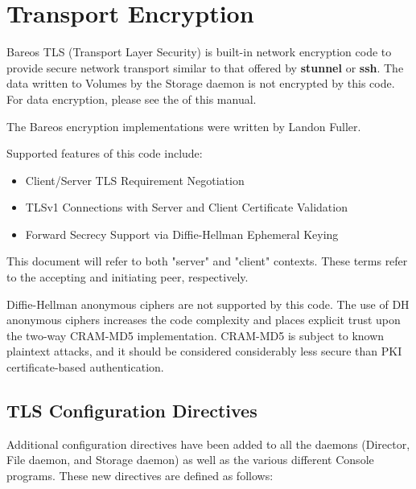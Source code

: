 
\chapter{Transport Encryption}
\label{CommEncryption}
\label{sec:TransportEncryption}

Bareos TLS (Transport Layer Security) is built-in network
encryption code to provide secure network transport similar to
that offered by {\bf stunnel} or {\bf ssh}.  The data written to
Volumes by the Storage daemon is not encrypted by this code.
For data encryption, please see the  of this manual.

The Bareos encryption implementations were written by Landon Fuller.

Supported features of this code include:
\begin{itemize}
\item Client/Server TLS Requirement Negotiation
\item TLSv1 Connections with Server and Client Certificate
Validation
\item Forward Secrecy Support via Diffie-Hellman Ephemeral Keying
\end{itemize}

This document will refer to both "server" and "client" contexts.  These
terms refer to the accepting and initiating peer, respectively.

Diffie-Hellman anonymous ciphers are not supported by this code.  The
use of DH anonymous ciphers increases the code complexity and places
explicit trust upon the two-way CRAM-MD5 implementation.  CRAM-MD5 is
subject to known plaintext attacks, and it should be considered
considerably less secure than PKI certificate-based authentication.

\section{TLS Configuration Directives}
\label{TlsDirectives}
Additional configuration directives have been added to all the daemons
(Director, File daemon, and Storage daemon) as well as the various
different Console programs.
These new directives are defined as follows:

